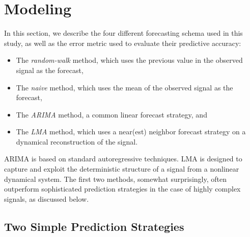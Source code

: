 \section{Modeling }\label{sec:model}
% 
% 
% 
% 

In this section, we describe the four different forecasting schema
used in this study, as well as the error metric used to evaluate their
predictive accuracy:
\begin{itemize}
\item The \emph{random-walk} method, which uses the previous value in
  the observed signal as the forecast,

\item The \emph{naive} method, which uses the mean of the
  observed signal as the forecast,

\item The \emph{ARIMA} method, a common linear forecast strategy, and

\item The \emph{LMA} method, which uses a near(est) neighbor forecast
  strategy on a dynamical reconstruction of the signal.
\end{itemize}
ARIMA is based on standard autoregressive techniques.  LMA is designed
to capture and exploit the deterministic structure of a signal from a
nonlinear dynamical system.  The first two methods, somewhat
surprisingly, often outperform sophisticated prediction strategies in
the case of highly complex signals, as discussed below.  

\subsection{Two Simple Prediction Strategies}
\label{sec:simple}

